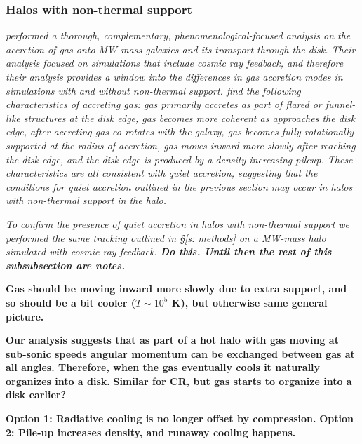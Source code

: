 \documentclass[fleqn,usenatbib]{mnras}
\begin{document}
\subsubsection{Halos with non-thermal support}
\label{s: broader prevalance -- non-thermal}

\textit{
\cite{Trapp2021} performed a thorough, complementary, phenomenological-focused analysis on the accretion of gas onto MW-mass galaxies and its transport through the disk.
Their analysis focused on simulations that include cosmic ray feedback, and therefore their analysis provides a window into the differences in gas accretion modes in simulations with and without non-thermal support.
\citeauthor{Trapp2021} find the following characteristics of accreting gas:
gas primarily accretes as part of flared or funnel-like structures at the disk edge,
gas becomes more coherent as approaches the disk edge,
after accreting gas co-rotates with the galaxy,
gas becomes fully rotationally supported at the radius of accretion,
gas moves inward more slowly after reaching the disk edge,
and the disk edge is produced by a density-increasing pileup.
These characteristics are all consistent with quiet accretion, suggesting that the conditions for quiet accretion outlined in the previous section may occur in halos with non-thermal support in the halo.
}

\textit{
To confirm the presence of quiet accretion in halos with non-thermal support we performed the same tracking outlined in \S\ref{s: methods} on a MW-mass halo simulated with cosmic-ray feedback.
\textbf{Do this. Until then the rest of this subsubsection are notes.}
}

\textbf{Gas should be moving inward more slowly due to extra support, and so should be a bit cooler ($T\sim 10^5$ K), but otherwise same general picture.}

\textbf{
Our analysis suggests that as part of a hot halo with gas moving at sub-sonic speeds angular momentum can be exchanged between gas at all angles.
Therefore, when the gas eventually cools it naturally organizes into a disk.
}
\textbf{
Similar for CR, but gas starts to organize into a disk earlier?
}

\textbf{Option 1: Radiative cooling is no longer offset by compression.}
\textbf{Option 2: Pile-up increases density, and runaway cooling happens.}
\end{document}
